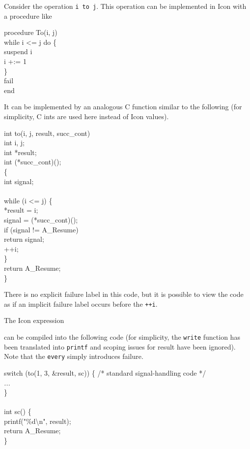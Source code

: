 Consider the operation \texttt{i to j}. This operation can be
implemented in Icon with a procedure like

\goodbreak
\begin{iconcode}
procedure To(i, j)\\
\>while i <= j do \{\\
\>\>suspend i\\
\>\>i +:= 1\\
\>\}\\
\>fail\\
end\\
\end{iconcode}


It can be implemented by an analogous C function similar to the
following (for simplicity, C ints are used here instead of Icon
values).

\goodbreak
\begin{iconcode}
int to(i, j, result, succ\_cont)\\
\>int i, j;\\
\>int *result;\\
\>int (*succ\_cont)();\\
\{\\
\>int signal;\\
\\
\>while (i <= j) \{\\
\>\>*result = i;\\
\>\>signal = (*succ\_cont)();\\
\>\>if (signal != A\_Resume)\\
\>\>\>return signal;\\
\>\>++i;\\
\>\}\\
\>return A\_Resume;\\
\}\\
\end{iconcode}

\noindent
There is no explicit failure label in this code, but it is possible to
view the code as if an implicit failure label occurs before the \texttt{++i}.


The Icon expression 


\noindent can be compiled into the following code (for simplicity, the
\texttt{write} function has been translated into \texttt{printf} and
scoping issues for result have been ignored). Note that the \texttt{every}
simply introduces failure.

\goodbreak
\begin{iconcode}
switch (to(1, 3, \&result, sc)) \{ /* standard signal-handling code */\\
\>\textit{...}\\
\}\\
\\
int sc() \{\\
\>printf("\%d{\textbackslash}n", result);\\
\>return A\_Resume;\\
\}\\
\end{iconcode}


